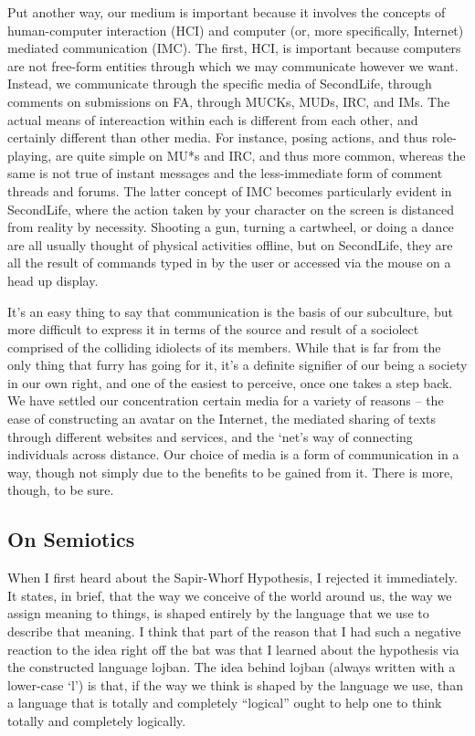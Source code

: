 Put another way, our medium is important because it involves the concepts of human-computer interaction (HCI) and computer (or, more specifically, Internet) mediated communication (IMC). The first, HCI, is important because computers are not free-form entities through which we may communicate however we want. Instead, we communicate through the specific media of SecondLife, through comments on submissions on FA, through MUCKs, MUDs, IRC, and IMs. The actual means of intereaction within each is different from each other, and certainly different than other media. For instance, posing actions, and thus role-playing, are quite simple on MU*s and IRC, and thus more common, whereas the same is not true of instant messages and the less-immediate form of comment threads and forums. The latter concept of IMC becomes particularly evident in SecondLife, where the action taken by your character on the screen is distanced from reality by necessity. Shooting a gun, turning a cartwheel, or doing a dance are all usually thought of physical activities offline, but on SecondLife, they are all the result of commands typed in by the user or accessed via the mouse on a head up display.

It's an easy thing to say that communication is the basis of our subculture, but more difficult to express it in terms of the source and result of a sociolect comprised of the colliding idiolects of its members. While that is far from the only thing that furry has going for it, it's a definite signifier of our being a society in our own right, and one of the easiest to perceive, once one takes a step back. We have settled our concentration certain media for a variety of reasons -- the ease of constructing an avatar on the Internet, the mediated sharing of texts through different websites and services, and the `net's way of connecting individuals across distance. Our choice of media is a form of communication in a way, though not simply due to the benefits to be gained from it. There is more, though, to be sure.

\subsection*{On Semiotics}

When I first heard about the Sapir-Whorf Hypothesis, I rejected it immediately. It states, in brief, that the way we conceive of the world around us, the way we assign meaning to things, is shaped entirely by the language that we use to describe that meaning. I think that part of the reason that I had such a negative reaction to the idea right off the bat was that I learned about the hypothesis via the constructed language lojban. The idea behind lojban (always written with a lower-case `l') is that, if the way we think is shaped by the language we use, than a language that is totally and completely ``logical'' ought to help one to think totally and completely logically.

